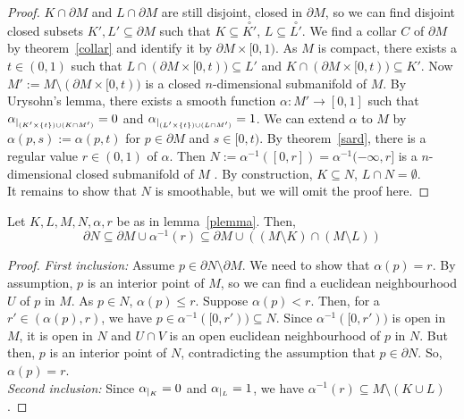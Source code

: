 \documentclass[a4paper,11pt]{article}
\begin{document}
\begin{proof}\cite{conner}
    \(K\cap\partial M\) and \(L\cap\partial M\) are still disjoint, closed in \(\partial M\), so we can find disjoint closed subsets \(K',L'\subseteq\partial M\) such that \(K\subseteq\overset{\circ}{K'}\), \(L\subseteq\overset{\circ}{L'}\). 
    We find a collar \(C\) of \(\partial M\) by theorem\ \ref{collar} and identify it by \(\partial M\times[0,1)\). As \(M\) is compact, there exists a \(t\in (0,1)\) such that \(L\cap (\partial M\times [0,t))\subseteq L'\) and \(K\cap (\partial M\times [0,t))\subseteq K'\). 
    Now \(M':=M\setminus (\partial M\times [0,t))\) is a closed \(n\)-dimensional submanifold of \(M\). By Urysohn's lemma, there exists a smooth function \(\alpha:M'\to[0,1]\) such that \(\alpha_{|_{(K'\times \{t\})\cup (K\cap M')}}=0\) and \(\alpha_{|_{(L'\times \{t\})\cup(L\cap M')}}=1\). 
    We can extend \(\alpha\) to \(M\) by \(\alpha(p,s):=\alpha(p,t)\) for \(p\in \partial M\) and \(s\in[0,t)\). 
    By theorem\ \ref{sard}, there is a regular value \(r\in(0,1)\) of \(\alpha\). 
    Then \(N:=\alpha^{-1}([0,r])=\alpha^{-1}(-\infty,r]\) is a \(n\)-dimensional closed submanifold of \(M\)%
    . By construction, \(K\subseteq N\), \(L\cap N=\emptyset\).\\
    It remains to show that \(N\) is smoothable, but we will omit the proof here.
\end{proof}


\begin{lemma}\label{plemma2}
    Let \(K,L,M,N,\alpha,r\) be as in lemma\ \ref{plemma}. Then,
    \[\partial N\subseteq \partial M\cup \alpha^{-1}(r)\subseteq \partial M\cup((M\setminus K)\cap(M\setminus L))\]
\end{lemma}

\begin{proof}\cite{zhang}
    \textit{First inclusion:} Assume \(p\in\partial N\setminus \partial M\). We need to show that \(\alpha(p)=r\). By assumption, \(p\) is an interior point of \(M\), so we can find a euclidean neighbourhood \(U\) of \(p\) in \(M\). 
    As \(p\in N\), \(\alpha(p)\leq r\). Suppose \(\alpha(p)<r\). Then, for a \(r'\in(\alpha(p),r)\), we have \(p\in\alpha^{-1}([0,r'))\subseteq N\). Since \(\alpha^{-1}([0,r'))\) is open in \(M\), it is open in \(N\) and \(U\cap V\) is an open euclidean neighbourhood of \(p\) in \(N\). But then, \(p\) is an interior point of \(N\), contradicting the assumption that \(p\in\partial N\). So, \(\alpha(p)=r\).\\
    \textit{Second inclusion:} Since \(\alpha_{|_{K}}=0\) and \(\alpha_{|_{L}}=1\), we have \(\alpha^{-1}(r)\subseteq M\setminus (K\cup L)\).
\end{proof}
\end{document}
